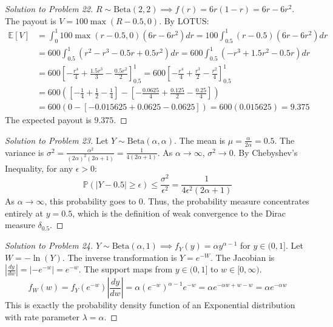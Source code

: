 \documentclass[11pt, a4paper]{article}
\theoremstyle{definition}
\theoremstyle{remark}
\newcommand{\E}{\mathbb{E}}
\newcommand{\Prob}{\mathbb{P}}
\begin{document}
\begin{proof}[Solution to Problem 22]
$R \sim \text{Beta}(2, 2) \implies f(r) = 6r(1-r) = 6r - 6r^2$.
The payout is $V = 100 \max(R - 0.5, 0)$. By LOTUS:
\begin{align*}
\E[V] &= \int_0^1 100 \max(r - 0.5, 0) (6r - 6r^2) dr = 100 \int_{0.5}^1 (r - 0.5)(6r - 6r^2) dr \\
&= 600 \int_{0.5}^1 (r^2 - r^3 - 0.5r + 0.5r^2) dr = 600 \int_{0.5}^1 (-r^3 + 1.5r^2 - 0.5r) dr \\
&= 600 \left[ -\frac{r^4}{4} + \frac{1.5r^3}{3} - \frac{0.5r^2}{2} \right]_{0.5}^1 = 600 \left[ -\frac{r^4}{4} + \frac{r^3}{2} - \frac{r^2}{4} \right]_{0.5}^1 \\
&= 600 \left( \left[ -\frac{1}{4} + \frac{1}{2} - \frac{1}{4} \right] - \left[ -\frac{0.0625}{4} + \frac{0.125}{2} - \frac{0.25}{4} \right] \right) \\
&= 600 \left( 0 - \left[ -0.015625 + 0.0625 - 0.0625 \right] \right) = 600 (0.015625) = 9.375
\end{align*}
The expected payout is $9.375$.
\end{proof}

\begin{proof}[Solution to Problem 23]
Let $Y \sim \text{Beta}(\alpha, \alpha)$. The mean is $\mu = \frac{\alpha}{2\alpha} = 0.5$.
The variance is $\sigma^2 = \frac{\alpha^2}{(2\alpha)^2(2\alpha+1)} = \frac{1}{4(2\alpha+1)}$.
As $\alpha \to \infty$, $\sigma^2 \to 0$.
By Chebyshev's Inequality, for any $\epsilon > 0$:
\[
\Prob(|Y - 0.5| \ge \epsilon) \le \frac{\sigma^2}{\epsilon^2} = \frac{1}{4\epsilon^2(2\alpha+1)}
\]
As $\alpha \to \infty$, this probability goes to 0. Thus, the probability measure concentrates entirely at $y = 0.5$, which is the definition of weak convergence to the Dirac measure $\delta_{0.5}$.
\end{proof}

\begin{proof}[Solution to Problem 24]
$Y \sim \text{Beta}(\alpha, 1) \implies f_Y(y) = \alpha y^{\alpha-1}$ for $y \in (0, 1]$.
Let $W = -\ln(Y)$. The inverse transformation is $Y = e^{-W}$.
The Jacobian is $\left| \frac{dy}{dw} \right| = \left| -e^{-w} \right| = e^{-w}$.
The support maps from $y \in (0, 1]$ to $w \in [0, \infty)$.
\[
f_W(w) = f_Y(e^{-w}) \left| \frac{dy}{dw} \right| = \alpha (e^{-w})^{\alpha-1} e^{-w} = \alpha e^{-\alpha w + w - w} = \alpha e^{-\alpha w}
\]
This is exactly the probability density function of an Exponential distribution with rate parameter $\lambda = \alpha$.
\end{proof}
\end{document}
